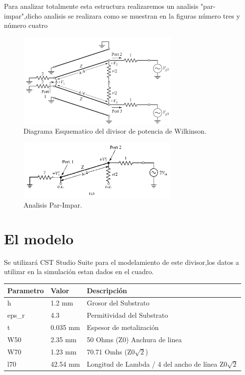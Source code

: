 \documentclass[a4paper]{IEEEtran} %
\begin{document}
Para analizar totalmente esta estructura realizaremos un analisis "par-impar",dicho analisis se realizara como se muestran en la figuras número tres y número cuatro 
\begin{figure}[h]
    \label{fig:scattering}
    \centering
    \includegraphics[width=8cm]{imagenes/img3}
    \caption{Diagrama Esquematico del divisor de potencia de Wilkinson.}
\end{figure}
\begin{figure}[h]
    \centering
        \includegraphics[width=8cm]{imagenes/img4}
        \caption{Analisis Par-Impar.}
\end{figure}
\vspace{10cm}
\section{El modelo}
Se utilizará CST Studio Suite para el modelamiento de este divisor,los datos a utilizar en la simulación estan dados en el cuadro.
\begin{table}[h]
\begin{tabular}{@{}lll@{}}
\toprule
Parametro & Valor    & Descripción                               \\ \midrule
h         & 1.2 mm   & Grosor del Substrato                      \\
eps\_r    & 4.3      & Permitividad del Substrato                \\
t         & 0.035 mm & Espesor de metalización                   \\ \midrule
W50       & 2.35 mm  & 50 Ohms (Z0) Anchura de linea               \\
W70       & 1.23 mm  & 70.71 Omhs (Z0$\sqrt{2}$)                          \\
l70       & 42.54 mm & Longitud de Lambda / 4 del ancho de línea Z0$\sqrt{2}$\\ \bottomrule
\end{tabular}
\end{table}
%
%
\end{document}
